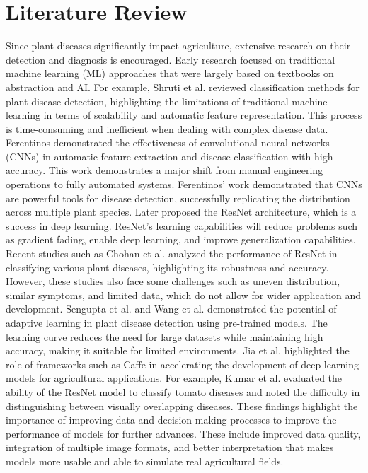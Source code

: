 \documentclass[conference]{IEEEtran}
\begin{document}
\section{\textbf{Literature Review}}
Since plant diseases significantly impact agriculture, extensive research on their detection and diagnosis is encouraged. Early research focused on traditional machine learning (ML) approaches that were largely based on textbooks on abstraction and AI. For example, Shruti et al.  reviewed classification methods for plant disease detection, highlighting the limitations of traditional machine learning in terms of scalability and automatic feature representation. This process is time-consuming and inefficient when dealing with complex disease data. Ferentinos \cite{r6} demonstrated the effectiveness of convolutional neural networks (CNNs) in automatic feature extraction and disease classification with high accuracy. This work demonstrates a major shift from manual engineering operations to fully automated systems. Ferentinos’ work demonstrated that CNNs are powerful tools for disease detection, successfully replicating the distribution across multiple plant species. \cite{r7} Later proposed the ResNet architecture, which is a success in deep learning. ResNet’s learning capabilities will reduce problems such as gradient fading, enable deep learning, and improve generalization capabilities. Recent studies such as Chohan et al. analyzed the performance of ResNet in classifying various plant diseases, highlighting its robustness and accuracy. However, these studies also face some challenges such as uneven distribution, similar symptoms, and limited data, which do not allow for wider application and development. Sengupta et al. \cite{r12} and Wang et al. \cite{r11} demonstrated the potential of adaptive learning in plant disease detection using pre-trained models. The learning curve reduces the need for large datasets while maintaining high accuracy, making it suitable for limited environments. Jia et al. \cite{r10} highlighted the role of frameworks such as Caffe in accelerating the development of deep learning models for agricultural applications. For example, Kumar et al.  evaluated the ability of the ResNet model to classify tomato diseases and noted the difficulty in distinguishing between visually overlapping diseases. These findings highlight the importance of improving data and decision-making processes to improve the performance of models for further advances. These include improved data quality, integration of multiple image formats, and better interpretation that makes models more usable and able to simulate real agricultural fields.
\end{document}
